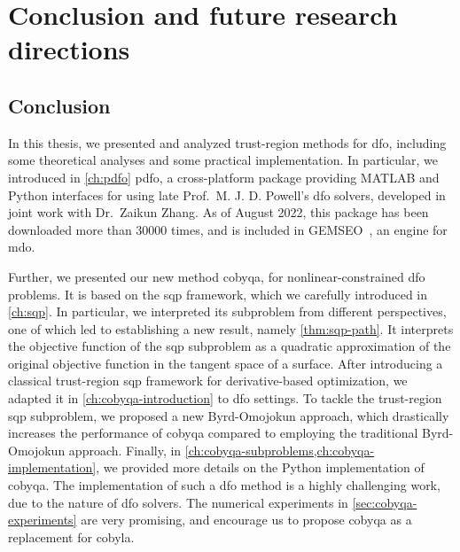 %
%
%
\chapter{Conclusion and future research directions}
\label{ch:conclusion}

\section{Conclusion}

In this thesis, we presented and analyzed trust-region methods for \gls{dfo}, including some theoretical analyses and some practical implementation.
In particular, we introduced in \cref{ch:pdfo} \gls{pdfo}, a cross-platform package providing MATLAB and Python interfaces for using late Prof.\ M. J. D. Powell's \gls{dfo} solvers, developed in joint work with Dr.\ Zaikun Zhang.
As of August 2022, this package has been downloaded more than \num{30000} times, and is included in GEMSEO~\cite{Gallard_Etal_2018}, an engine for \gls{mdo}.

Further, we presented our new method \gls{cobyqa}, for nonlinear-constrained \gls{dfo} problems.
It is based on the \gls{sqp} framework, which we carefully introduced in \cref{ch:sqp}.
In particular, we interpreted its subproblem from different perspectives, one of which led to establishing a new result, namely \cref{thm:sqp-path}.
It interprets the objective function of the \gls{sqp} subproblem as a quadratic approximation of the original objective function in the tangent space of a surface.
After introducing a classical trust-region \gls{sqp} framework for derivative-based optimization, we adapted it in \cref{ch:cobyqa-introduction} to \gls{dfo} settings.
To tackle the trust-region \gls{sqp} subproblem, we proposed a new Byrd-Omojokun approach, which drastically increases the performance of \gls{cobyqa} compared to employing the traditional Byrd-Omojokun approach.
Finally, in \cref{ch:cobyqa-subproblems,ch:cobyqa-implementation}, we provided more details on the Python implementation of \gls{cobyqa}.
The implementation of such a \gls{dfo} method is a highly challenging work, due to the nature of \gls{dfo} solvers.
The numerical experiments in \cref{sec:cobyqa-experiments} are very promising, and encourage us to propose \gls{cobyqa} as a replacement for \gls{cobyla}.

